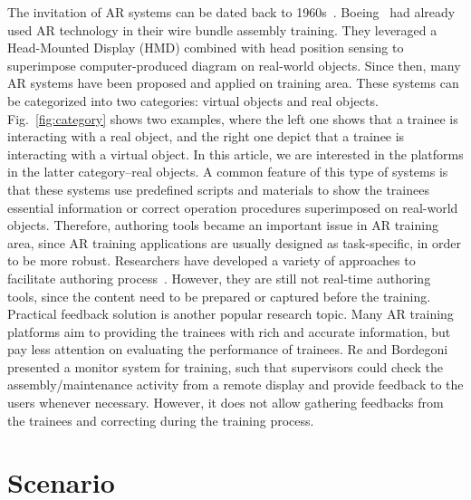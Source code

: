 The invitation of AR systems can be dated back to 1960s~\cite{sutherland1968,johnson2010, yuen2011}. Boeing~\cite{caudell1992} had already used AR technology in their wire bundle assembly training. They leveraged a Head-Mounted Display (HMD) combined with head position sensing to superimpose computer-produced diagram on real-world objects. Since then, many AR systems have been proposed and applied on training area. These systems can be categorized into two categories: virtual objects and real objects. Fig.~\ref{fig:category} shows two examples, where the left one shows that a trainee is interacting with a real object, and the right one depict that a trainee is interacting with a virtual object. In this article, we are interested in the platforms in the latter category--real objects. A common feature of this type of systems is that these systems use predefined scripts and materials to show the trainees essential information or correct operation procedures superimposed on real-world objects.
Therefore, authoring tools became an important issue in AR training area, since AR training applications are usually designed as task-specific, in order to be more robust.
Researchers have developed a variety of approaches to facilitate authoring process~\cite{wang2010,petersen2012,anderson2013,bhattacharya2015}.
However, they are still not real-time authoring tools, since the content need to be prepared or captured before the training.
Practical feedback solution is another popular research topic. Many AR training platforms aim to providing the trainees with rich and accurate information, but pay less attention on evaluating the performance of trainees. Re and Bordegoni~\cite{re2014} presented a monitor system for training, such that supervisors could check the assembly/maintenance activity from a remote display and provide feedback to the users whenever necessary. However, it does not allow gathering feedbacks from the trainees and correcting during the training process.

\section{Scenario}
\label{sec:i:s}

